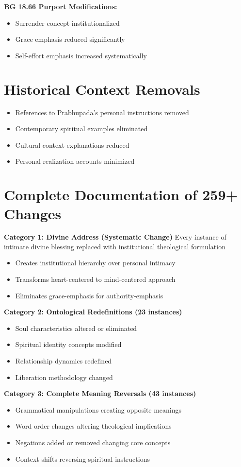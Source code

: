 \documentclass[11pt,twoside]{book}
\begin{document}
\textbf{\textbf{BG 18.66 Purport Modifications:}}
\begin{itemize}
\item Surrender concept institutionalized
\item Grace emphasis reduced significantly
\item Self-effort emphasis increased systematically
\end{itemize}
\section*{Historical Context Removals}
\label{sec:org9ebeb4f}
\begin{itemize}
\item References to Prabhupāda's personal instructions removed
\item Contemporary spiritual examples eliminated
\item Cultural context explanations reduced
\item Personal realization accounts minimized
\end{itemize}
\section*{Complete Documentation of 259+ Changes}
\label{sec:org00af16c}

\textbf{\textbf{Category 1: Divine Address (Systematic Change)}}
Every instance of intimate divine blessing replaced with institutional theological formulation
\begin{itemize}
\item Creates institutional hierarchy over personal intimacy
\item Transforms heart-centered to mind-centered approach
\item Eliminates grace-emphasis for authority-emphasis
\end{itemize}

\textbf{\textbf{Category 2: Ontological Redefinitions (23 instances)}}
\begin{itemize}
\item Soul characteristics altered or eliminated
\item Spiritual identity concepts modified
\item Relationship dynamics redefined
\item Liberation methodology changed
\end{itemize}

\textbf{\textbf{Category 3: Complete Meaning Reversals (43 instances)}}
\begin{itemize}
\item Grammatical manipulations creating opposite meanings
\item Word order changes altering theological implications
\item Negations added or removed changing core concepts
\item Context shifts reversing spiritual instructions
\end{itemize}
\end{document}
